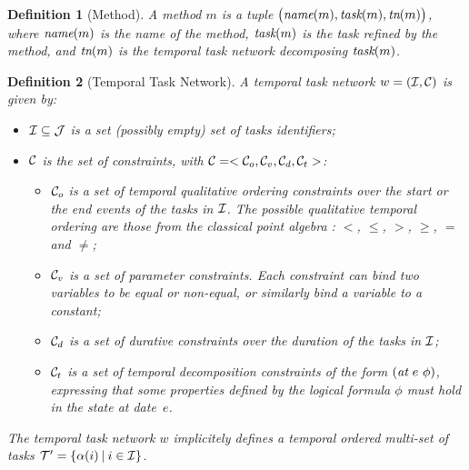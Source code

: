 \documentclass[letterpaper]{article} %
\newtheorem{definition}{Definition}
\newcommand{\at}{\text{\it at}}
\newcommand{\name}{\text{\it name}}
\newcommand{\task}{\text{\it task}}
\newcommand{\tn}{\text{\it tn}}
\begin{document}
\begin{definition}[Method]\label{def:met}
A \emph{method} $m$ is a tuple $\bigl(\name(m), \task(m), \tn(m)\bigr)$, where $\name(m)$ is the name of the method, $\task(m)$ is the task refined by the method, and $\tn(m)$ is the temporal task network decomposing $\task(m)$. %
\end{definition}



\begin{definition}[Temporal Task Network]\label{def:TNN}
A \emph{temporal task network} $w = ({\cal{I}}, {\cal{C}})$ is given by: %
\begin{itemize}

    \item $\cal{I} \subseteq \cal{J}$ is a set (possibly empty) set of tasks identifiers;

    \item $\cal{C}$ is the set of constraints, with ${\cal{C}} = < {\cal{C}}_o, {\cal{C}}_v, {\cal{C}}_d, {\cal{C}}_t >$:
      \begin{itemize}
      \item ${\cal{C}}_o$ is a set of temporal qualitative ordering constraints over the start or the end events of the tasks in $\cal{I}$. The possible qualitative temporal ordering are those from the classical point algebra \cite{broxvall03}: $<$, $\leq$, $>$, $\geq$, $=$ and $\neq$;

      \item ${\cal{C}}_v$ is a set of parameter constraints. Each constraint can bind two variables to be equal or non-equal, or similarly bind a variable to a constant; %

      \item ${\cal{C}}_d$ is a set of durative constraints over the duration of the tasks in $\cal{I}$;

      \item ${\cal{C}}_t$ is a set of temporal decomposition constraints of the form $(\at \ e \ \phi)$, expressing that some properties defined by the logical formula $\phi$ must hold in the state at \mbox{date $e$.} 
      \end{itemize}
\end{itemize}
The temporal task network $w$ implicitely defines a temporal ordered multi-set of tasks ${\cal{T}}' = \{ \alpha(i) \: | \: i \in {\cal{I}} \}$.
\end{definition}
\end{document}
